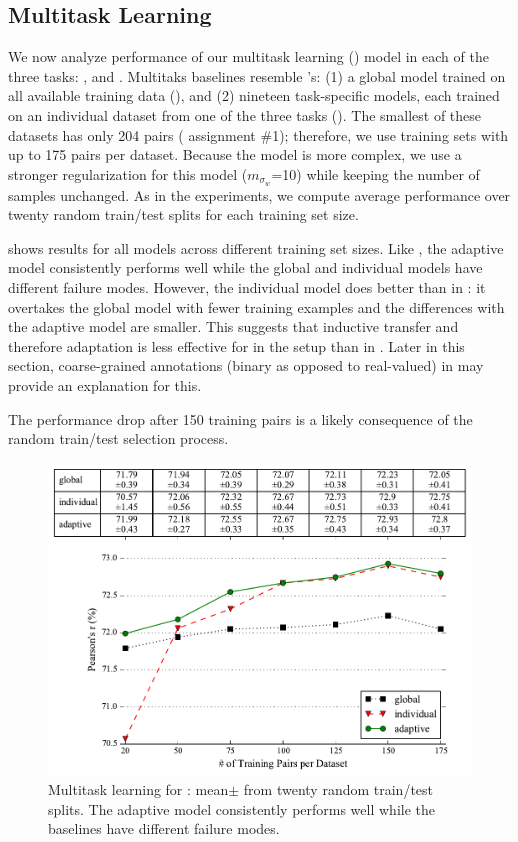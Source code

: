 \subsection{Multitask Learning}


We now analyze performance of our multitask learning (\mtl{}) model in
each of the three tasks:
\sts{}, \sas{} and \asr{}.  Multitaks baselines resemble \da{}'s:
 (1) a global model trained on all available training data
(), and (2) nineteen task-specific
models, each trained on an individual dataset from one of the three
tasks ().  The smallest of these datasets has
only 204 pairs (\sas{} assignment \#1); therefore, we use training
sets with up to 175 pairs per dataset.  Because the \mtl{} model is
more complex, we use a stronger regularization for this model
($m_{\sigma_w}$=10) while keeping the number of  samples
unchanged.  As in the \da{} experiments, we compute average
performance over twenty random train/test splits for each training set
size.

 shows \sts{} results for all models across
different training set sizes.  Like \da{}, the adaptive model
consistently performs well while the global and individual models have
different failure modes.  However, the individual model does better
than in \da{}: it overtakes the global model with fewer training
examples and the differences with the adaptive model are smaller.
This suggests that inductive transfer and therefore adaptation is less
effective for \sts{} in the \mtl{} setup than in \da{}.
Later in this section, coarse-grained \asr{}
annotations (binary as opposed to real-valued) in \mtl{} may provide
an explanation for this.


The performance drop after 150 training pairs is a likely
consequence of the random train/test selection process.

\begin{figure}[t]
\centering
\includegraphics[scale=0.47]{2016_naacl_stsdomain/figures/sts_multitask_learning_results.pdf}
\caption
{Multitask learning for \sts{}: mean$\pm$ from
twenty random train/test splits.  The adaptive model consistently
performs well while the baselines have different failure modes.  }
\label{figure:sts-mtl-results}
\end{figure}

